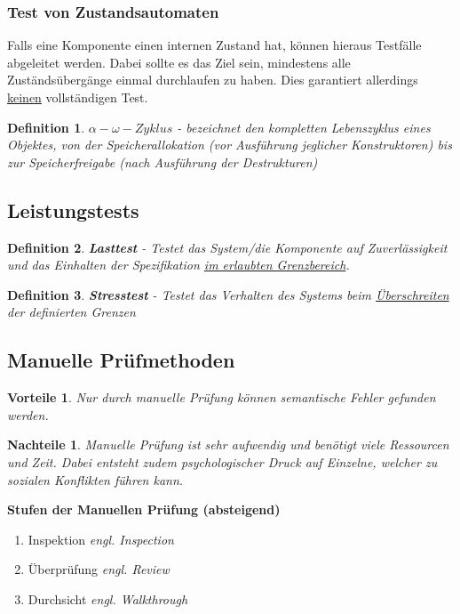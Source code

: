 \documentclass[a4paper]{article}
\theoremstyle{break}
\newtheorem{defi}{Definition}[section]
\newtheorem{why}{Vorteile}[section]
\newtheorem{whynot}{Nachteile}[section]
\begin{document}
        \subsubsection{Test von Zustandsautomaten}
        Falls eine Komponente einen internen Zustand hat, k\"onnen hieraus Testf\"alle abgeleitet werden. Dabei sollte es das Ziel sein, mindestens alle Zust\"ands\"uberg\"ange einmal durchlaufen zu haben. Dies garantiert allerdings \ul{keinen} vollständigen Test.

        \begin{defi}
          \textbf{\(\alpha - \omega -Zyklus \)} - bezeichnet den kompletten Lebenszyklus eines Objektes, von der Speicherallokation (vor Ausf\"uhrung jeglicher Konstruktoren) bis zur Speicherfreigabe (nach Ausf\"uhrung der Destrukturen)
        \end{defi}
        
        
        \subsection{Leistungstests}
        \begin{defi}
          \textbf{Lasttest} - Testet das System/die Komponente auf Zuverl\"assigkeit und das Einhalten der Spezifikation \ul{im erlaubten Grenzbereich}.
        \end{defi}

        \begin{defi}
          \textbf{Stresstest} - Testet das Verhalten des Systems beim \ul{\"Uberschreiten} der definierten Grenzen
        \end{defi}
        
        
        \subsection{Manuelle Prüfmethoden}
        \begin{why}
        Nur durch manuelle Pr\"ufung k\"onnen semantische Fehler gefunden werden. 
        \end{why}
        \begin{whynot}
          Manuelle Prüfung ist sehr aufwendig und benötigt viele Ressourcen und Zeit.
          Dabei entsteht zudem psychologischer Druck auf Einzelne, welcher zu sozialen Konflikten f\"uhren kann.
        \end{whynot}
        
          \textbf{Stufen der Manuellen Prüfung (absteigend)}
          \begin{enumerate}
          \item Inspektion \textit{engl. Inspection}
          \item Überprüfung \textit{engl. Review}
          \item Durchsicht \textit{engl. Walkthrough}
          \end{enumerate}
        
\end{document}
